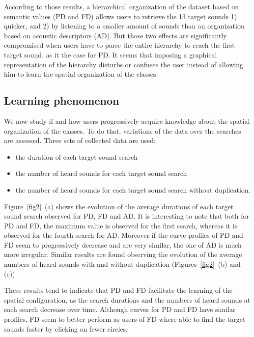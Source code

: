 \documentclass{aes2e}
\begin{document}
According to those results, a hierarchical organization of the dataset based on semantic values (PD and FD) allows users to retrieve the 13 target sounds 1) quicker, and 2) by listening to a smaller amount of sounds than an organization based on acoustic descriptors (AD). But those two effects are significantly compromised when users have to parse the entire hierarchy to reach the first target sound, as it the case for PD. It seems that imposing a graphical representation of the hierarchy disturbs or confuses the user instead of allowing him to learn the spatial organization of the classes. 


\subsection{Learning phenomenon}

We now study if and how users  progressively acquire knowledge about the spatial organization of the classes. To do that, variations of the data over the searches are assessed. Three sets of collected data are used:

\begin{itemize}
\item the duration of each target sound search 
\item the number of heard sounds for each target sound search 
\item the number of heard sounds for each target sound search without duplication. 
\end{itemize}

Figure~\ref{fig2}~(a) shows the evolution of the average durations of each target sound search observed for PD, FD and AD. It is interesting to note that both for PD and FD, the maximum value is observed for the first search, whereas it is observed for the fourth search for AD. Moreover if the curve profiles of PD and FD  seem to progressively decrease and are very similar, the one of AD is much more irregular. Similar results are found observing the evolution of the average numbers of heard sounds with and without duplication (Figures~\ref{fig2}~(b) and (c)) 

These results tend to indicate that PD and FD facilitate the learning of the spatial configuration, as the search durations and the numbers of heard sounds at each search decrease over time. Although curves for PD and FD have similar profiles, FD seem to better perform as users of FD where able to find the target sounds faster by clicking on fewer circles.
\end{document}
